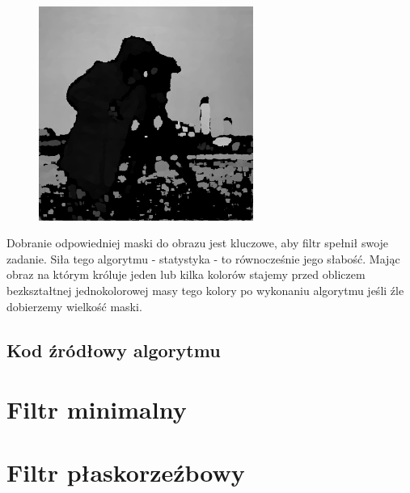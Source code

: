 \documentclass[a4paper,12pt]{book}
\begin{document}
\begin{figure}[H]
				\includegraphics[width=7cm, height=7cm]{man-filter-modal27x27.png}
			\end{figure}
			Dobranie odpowiedniej maski do obrazu jest kluczowe, aby filtr spełnił swoje zadanie. Siła tego algorytmu - statystyka - to równocześnie jego słabość. Mając obraz na którym króluje jeden lub kilka kolorów stajemy przed obliczem bezkształtnej jednokolorowej masy tego kolory po wykonaniu algorytmu jeśli źle dobierzemy wielkość maski. 
		\subsection{Kod źródłowy algorytmu}
	\section{Filtr minimalny}
	\section{Filtr płaskorzeźbowy}
\end{document}
